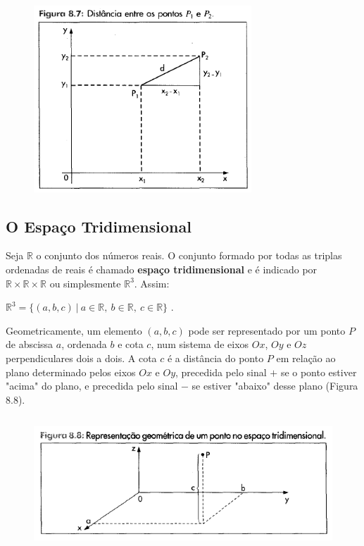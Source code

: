 		\begin{figure}[H]
			\includegraphics[height=7cm]{images/morettin_figura-8-7}
		\end{figure}

	\subsection{O Espaço Tridimensional \cite{morettin}}

		Seja $\mathbb{R}$ o conjunto dos números reais. O conjunto formado por todas as triplas ordenadas de reais é chamado \textbf{espaço tridimensional} e é indicado por $\mathbb{R} \times \mathbb{R} \times \mathbb{R}$ ou simplesmente $\mathbb{R}^{3}$. Assim:

		\bigskip

		{\LARGE $\mathbb{R}^{3} = \{(a, b, c) \ | \ a \in \mathbb{R}, \ b \in \mathbb{R}, \ c \in \mathbb{R} \}$} .
		
		\bigskip		
		
		Geometricamente, um elemento $(a, b, c)$ pode ser representado por um ponto $P$ de abscissa $a$, ordenada $b$ e cota $c$, num sistema de eixos $Ox$, $Oy$ e $Oz$ perpendiculares dois a dois. A cota $c$ é a distância do ponto $P$ em relação ao plano determinado pelos eixos $Ox$ e $Oy$, precedida pelo sinal $+$ se o ponto estiver "acima" do plano, e precedida pelo sinal $-$ se estiver "abaixo" desse plano (Figura 8.8).
		
		\begin{figure}[H]
			\includegraphics[height=5cm]{images/morettin_figura-8-8}
		\end{figure}

